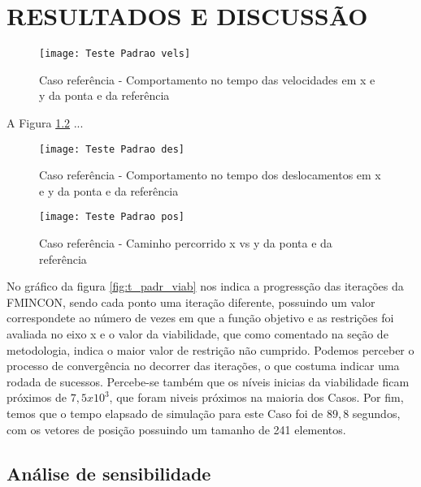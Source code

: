 \chapter{RESULTADOS E DISCUSSÃO}


\begin{figure}[H]
    \begin{center}
    \caption{Caso referência - Comportamento no tempo das velocidades em x e y da ponta e da referência}
    \texttt{[image: Teste Padrao vels]}
    \label{fig:t_padr_vels}
    \end{center}
\end{figure}

A Figura \ref{fig:t_padr_des} ...

\begin{figure}[H]
    \begin{center}
    \caption{Caso referência - Comportamento no tempo dos deslocamentos em x e y da ponta e da referência}
    \texttt{[image: Teste Padrao des]}
    \label{fig:t_padr_des}
    \end{center}
\end{figure}

\begin{figure}[H]
    \begin{center}
    \caption{Caso referência - Caminho percorrido x vs y da ponta e da referência}
    \texttt{[image: Teste Padrao pos]}
    \label{fig:t_padr_pos}
    \end{center}
\end{figure}

No gráfico da figura \ref{fig:t_padr_viab} nos indica a progressção das iterações da FMINCON, sendo cada
ponto uma iteração diferente, possuindo um valor correspondete ao número de vezes em que a função objetivo e as restrições foi avaliada
no eixo x e o valor da viabilidade, que como comentado na seção de metodologia, indica o maior valor de restrição não cumprido.
Podemos perceber o processo de convergência no decorrer das iterações, o que costuma indicar uma rodada de sucessos.
Percebe-se também que os níveis inicias da viabilidade ficam próximos de $7,5x10^3$, que foram niveis próximos na maioria dos Casos.
Por fim, temos que o tempo elapsado de simulação para este Caso foi de $89,8$ segundos, com os vetores de posição possuindo
um tamanho de 241 elementos.

\section{Análise de sensibilidade}

